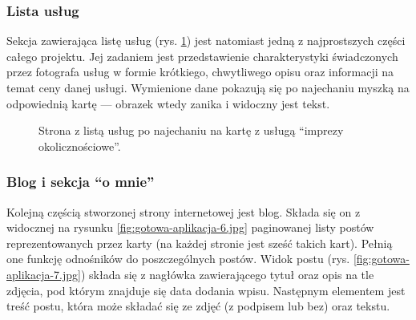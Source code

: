 \documentclass[a4paper, 12pt]{article}
\numberwithin{figure}{section}
\begin{document}
\begin{sloppypar}
\subsubsection*{Lista usług}

Sekcja zawierająca listę usług (rys. \ref{fig:gotowa-aplikacja-5.jpg}) jest natomiast jedną z najprostszych części całego projektu. Jej zadaniem jest przedstawienie charakterystyki świadczonych przez fotografa usług w formie krótkiego, chwytliwego opisu oraz informacji na temat ceny danej usługi. Wymienione dane pokazują się po najechaniu myszką na odpowiednią kartę --- obrazek wtedy zanika i widoczny jest tekst. 

\begin{figure}[H] 
    \centering
   \caption{Strona z listą usług po najechaniu na kartę z usługą ``imprezy okolicznościowe''.}
   \label{fig:gotowa-aplikacja-5.jpg}
\end{figure}

\subsubsection*{Blog i sekcja ``o mnie''}

Kolejną częścią stworzonej strony internetowej jest blog. Składa się on z widocznej na rysunku \ref{fig:gotowa-aplikacja-6.jpg} paginowanej listy postów reprezentowanych przez karty (na każdej stronie jest sześć takich kart). Pełnią one funkcję odnośników do poszczególnych postów. Widok postu (rys. \ref{fig:gotowa-aplikacja-7.jpg}) składa się z nagłówka zawierającego tytuł oraz opis na tle zdjęcia, pod którym znajduje się data dodania wpisu. Następnym elementem jest treść postu, która może składać się ze zdjęć (z podpisem lub bez) oraz tekstu. 


\end{sloppypar}
\end{document}

